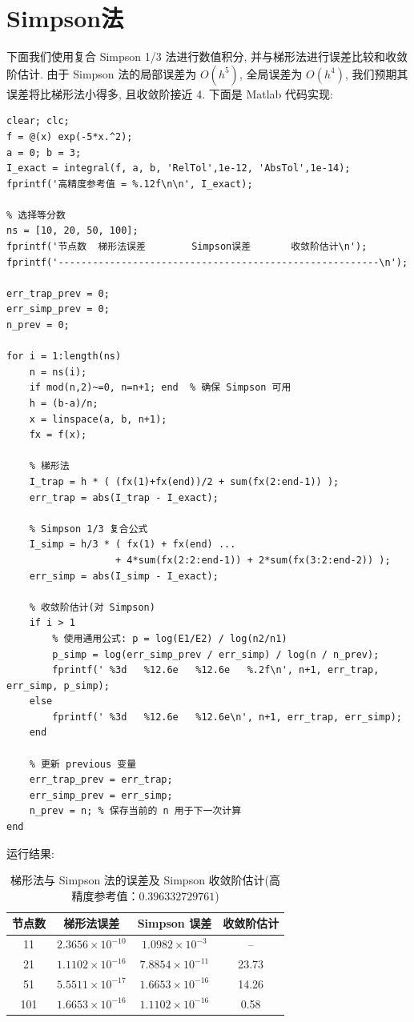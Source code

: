 \documentclass[12pt,a4paper]{ctexart}
\begin{document}
\section{Simpson法}
下面我们使用复合 Simpson 1/3 法进行数值积分, 并与梯形法进行误差比较和收敛阶估计. 由于 Simpson 法的局部误差为 $O(h^5)$, 全局误差为 $O(h^4)$, 我们预期其误差将比梯形法小得多, 且收敛阶接近 4. 下面是 Matlab 代码实现:
\begin{lstlisting}[caption={Simpson 1/3 复合求积与梯形法对比}]
clear; clc;
f = @(x) exp(-5*x.^2);
a = 0; b = 3;
I_exact = integral(f, a, b, 'RelTol',1e-12, 'AbsTol',1e-14);
fprintf('高精度参考值 = %.12f\n\n', I_exact);

% 选择等分数
ns = [10, 20, 50, 100];
fprintf('节点数  梯形法误差        Simpson误差       收敛阶估计\n');
fprintf('--------------------------------------------------------\n');

err_trap_prev = 0;
err_simp_prev = 0;
n_prev = 0; 

for i = 1:length(ns)
    n = ns(i);
    if mod(n,2)~=0, n=n+1; end  % 确保 Simpson 可用
    h = (b-a)/n;
    x = linspace(a, b, n+1);
    fx = f(x);
    
    % 梯形法
    I_trap = h * ( (fx(1)+fx(end))/2 + sum(fx(2:end-1)) );
    err_trap = abs(I_trap - I_exact);
    
    % Simpson 1/3 复合公式
    I_simp = h/3 * ( fx(1) + fx(end) ...
                   + 4*sum(fx(2:2:end-1)) + 2*sum(fx(3:2:end-2)) );
    err_simp = abs(I_simp - I_exact);
    
    % 收敛阶估计(对 Simpson)
    if i > 1
        % 使用通用公式: p = log(E1/E2) / log(n2/n1)
        p_simp = log(err_simp_prev / err_simp) / log(n / n_prev);
        fprintf(' %3d   %12.6e   %12.6e   %.2f\n', n+1, err_trap, err_simp, p_simp);
    else
        fprintf(' %3d   %12.6e   %12.6e\n', n+1, err_trap, err_simp);
    end
    
    % 更新 previous 变量
    err_trap_prev = err_trap;
    err_simp_prev = err_simp;
    n_prev = n; % 保存当前的 n 用于下一次计算
end
\end{lstlisting}
运行结果:
\begin{table}[H]
\centering
\caption{梯形法与 Simpson 法的误差及 Simpson 收敛阶估计(高精度参考值：$0.396332729761$)}
\label{tab:error_convergence}
\small
\begin{tabular}{cccc}
\hline
节点数 & 梯形法误差 & Simpson 误差 & 收敛阶估计 \\
\hline
11  & $2.3656\times10^{-10}$ & $1.0982\times10^{-3}$  & -- \\
21  & $1.1102\times10^{-16}$ & $7.8854\times10^{-11}$ & 23.73 \\
51  & $5.5511\times10^{-17}$ & $1.6653\times10^{-16}$ & 14.26 \\
101 & $1.6653\times10^{-16}$ & $1.1102\times10^{-16}$ & 0.58 \\
\hline
\end{tabular}
\end{table}
\end{document}
